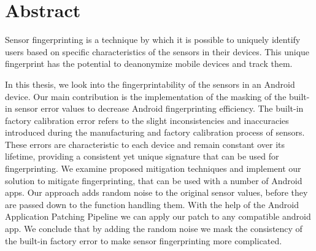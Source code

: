 \documentclass[11pt,
  oneside,openany,    %
]{scrreprt}
\begin{document}









\printthesistitle

\chapter*{Abstract}

Sensor fingerprinting is a technique by which it is possible to uniquely identify users based on specific characteristics of the sensors in their devices. 
This unique fingerprint has the potential to deanonymize mobile devices and track them.

In this thesis, we look into the fingerprintability of the sensors in an Android device.
Our main contribution is the implementation of the masking of the built-in sensor error values to decrease Android fingerprinting efficiency.
The built-in factory calibration error refers to the slight inconsistencies and inaccuracies introduced during the manufacturing and factory calibration process of sensors. 
These errors are characteristic to each device and remain constant over its lifetime, providing a consistent yet unique signature that can be used for fingerprinting.
We examine proposed mitigation techniques and implement our solution to mitigate fingerprinting, that can be used with a number of Android apps.
Our approach adds random noise to the original sensor values, before they are passed down to the function handling them.
With the help of the Android Application Patching Pipeline we can apply our patch to any compatible android app.
We conclude that by adding the random noise we mask the consistency of the built-in factory error to make sensor fingerprinting more complicated.
\end{document}
